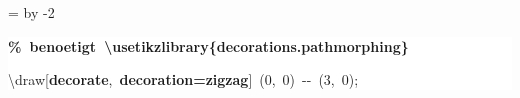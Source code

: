 \begingroup
\ttfamily
{}
=\textwidth
\advance{} by -2\fboxsep
\noindent
\colorbox{background}
{%
\parbox{\dimen255}
{%
\rule[-0.5ex]{0pt}{2.5ex}\hspace*{0.0em}\textcolor{G}{\textbf{\%~benoetigt~\textbackslash{}usetikzlibrary\{decorations.pathmorphing\}}}\\
\rule[-0.5ex]{0pt}{2.5ex}\hspace*{0.0em}\textbackslash{}draw[\textcolor{R}{\textbf{decorate}},~\textcolor{R}{\textbf{decoration=zigzag}}]~(0,~0)~{-}{-}~(3,~0);}%
}%
\endgroup
